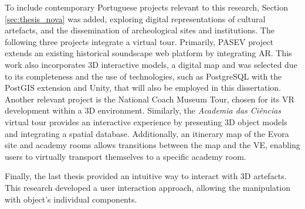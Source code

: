 To include contemporary Portuguese projects relevant to this research, Section \ref{sec:thesis_nova} was added, exploring digital representations of cultural artefacts, and the dissemination of archeological sites and institutions.
The following three projects integrate a virtual tour. Primarily, \gls{PASEV} project extends an existing historical soundscape web platform by integrating \gls{AR}. This work also incorporates 3D interactive models, a digital map and was selected due to its completeness and the use of technologies, such as PostgreSQL with the PostGIS extension and Unity, that will also be employed in this dissertation. 
Another relevant project is the National Coach Museum Tour, chosen for its \gls{VR} development within a 3D environment.
Similarly, the \textit{Academia das Ciências} virtual tour provides an interactive experience by presenting \gls{3D} object models and integrating a spatial database. Additionally, an itinerary map of the Evora site and academy rooms allows transitions between the map and the \gls{VE}, enabling users to virtually transport themselves to a specific academy room.

Finally, the last thesis provided an intuitive way to interact with \gls{3D} artefacts. This research developed a user interaction approach, allowing the manipulation with object's individual components.


\newcommand{\cmark}{\ding{51}} %
\newcommand{\xmark}{\ding{55}} %

